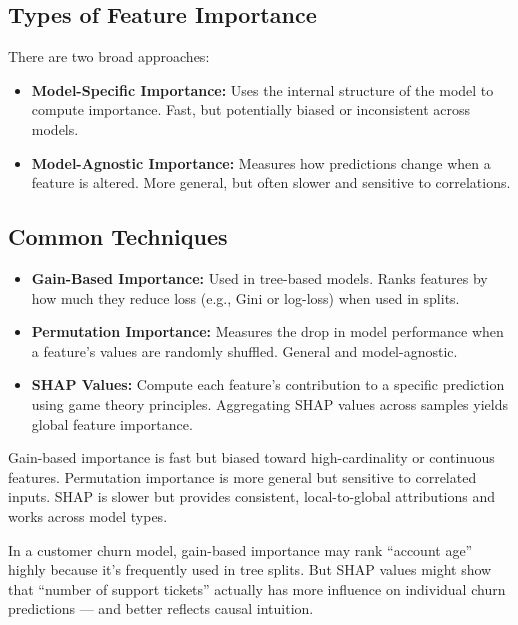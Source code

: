 \documentclass[12pt,openany]{book}
\begin{document}
\subsection{Types of Feature Importance}

There are two broad approaches:

\begin{itemize}
    \item \textbf{Model-Specific Importance:} Uses the internal structure of the model to compute importance. Fast, but potentially biased or inconsistent across models.
    \item \textbf{Model-Agnostic Importance:} Measures how predictions change when a feature is altered. More general, but often slower and sensitive to correlations.
\end{itemize}


\subsection{Common Techniques}

\begin{itemize}
    \item \textbf{Gain-Based Importance:} Used in tree-based models. Ranks features by how much they reduce loss (e.g., Gini or log-loss) when used in splits.
    \item \textbf{Permutation Importance:} Measures the drop in model performance when a feature’s values are randomly shuffled. General and model-agnostic.
    \item \textbf{SHAP Values:} Compute each feature’s contribution to a specific prediction using game theory principles. Aggregating SHAP values across samples yields global feature importance.
\end{itemize}

\begin{notebox}
Gain-based importance is fast but biased toward high-cardinality or continuous features. Permutation importance is more general but sensitive to correlated inputs. SHAP is slower but provides consistent, local-to-global attributions and works across model types.
\end{notebox}

\begin{examplebox}
In a customer churn model, gain-based importance may rank ``account age'' highly because it's frequently used in tree splits. But SHAP values might show that ``number of support tickets'' actually has more influence on individual churn predictions — and better reflects causal intuition.
\end{examplebox}
\end{document}
